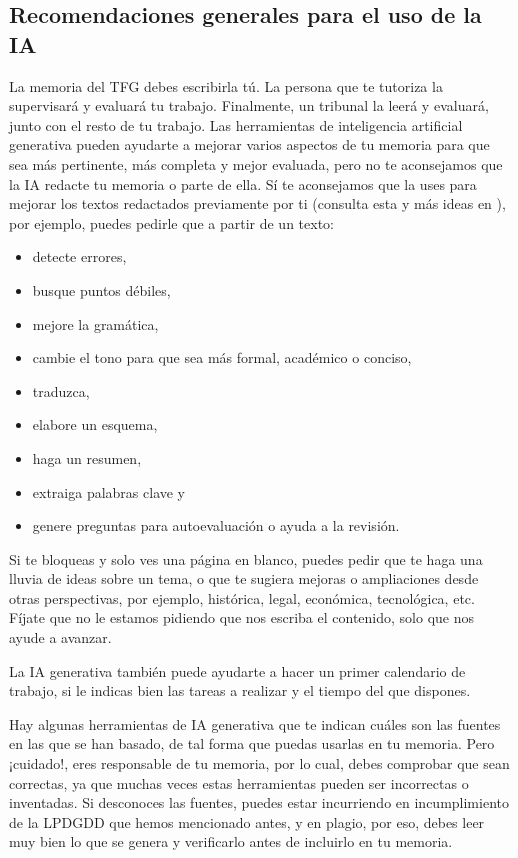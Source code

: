 \subsection{Recomendaciones generales para el uso de la IA} %
La memoria del TFG debes escribirla tú. La persona que te tutoriza la supervisará y evaluará tu trabajo. Finalmente, un tribunal la leerá y evaluará, junto con el resto de tu trabajo. Las herramientas de inteligencia artificial generativa pueden ayudarte a mejorar varios aspectos de tu memoria para que sea más pertinente, más completa y mejor evaluada, pero no te aconsejamos que la IA redacte tu memoria o parte de ella. Sí te aconsejamos que la uses para mejorar los textos redactados previamente por ti (consulta esta y más ideas en \cite{ugrIA}), por ejemplo, puedes pedirle que a partir de un texto: 
\begin{itemize}  
    \item detecte errores,
    \item busque puntos débiles,
    \item mejore la gramática,
    \item cambie el tono para que sea más formal, académico o conciso,
    \item traduzca,
    \item elabore un esquema,
    \item haga un resumen,
    \item extraiga palabras clave y 
    \item genere preguntas para autoevaluación o ayuda a la revisión.
\end{itemize} 

Si te bloqueas y solo ves una página en blanco, puedes pedir que te haga una lluvia de ideas sobre un tema, o que te sugiera mejoras o ampliaciones desde otras perspectivas, por ejemplo, histórica, legal, económica, tecnológica, etc. Fíjate que no le estamos pidiendo que nos escriba el contenido, solo que nos ayude a avanzar.

La IA generativa también puede ayudarte a hacer un primer calendario de trabajo, si le indicas bien las tareas a realizar y el tiempo del que dispones.

Hay algunas herramientas de IA generativa que te indican cuáles son las fuentes en las que se han basado, de tal forma que puedas usarlas en tu memoria. Pero ¡cuidado!, eres responsable de tu memoria, por lo cual, debes comprobar que sean correctas, ya que muchas veces estas herramientas pueden ser incorrectas o inventadas. Si desconoces las fuentes, puedes estar incurriendo en incumplimiento de la LPDGDD que hemos mencionado antes, y en plagio, por eso, debes leer muy bien lo que se genera y verificarlo antes de incluirlo en tu memoria.

